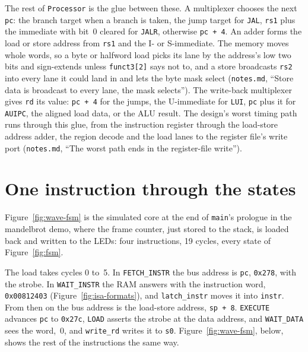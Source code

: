 \documentclass[11pt,a4paper]{report}
\newcommand{\notes}[1]{(\texttt{notes.md}, ``#1'')}
\begin{document}
The rest of \texttt{Processor} is the glue between these. A multiplexer chooses the next
\texttt{pc}: the branch target when a branch is taken, the jump target for \texttt{JAL},
\texttt{rs1} plus the immediate with bit~0 cleared for \texttt{JALR}, otherwise
\texttt{pc + 4}. An adder forms the load or store address from \texttt{rs1} and the I- or
S-immediate. The memory moves whole words, so a byte or halfword load picks its lane by the
address's low two bits and sign-extends unless \texttt{funct3[2]} says not to, and a store
broadcasts \texttt{rs2} into every lane it could land in and lets the byte mask select
\notes{Store data is broadcast to every lane, the mask selects}. The write-back multiplexer
gives \texttt{rd} its value: \texttt{pc + 4} for the jumps, the U-immediate for
\texttt{LUI}, \texttt{pc} plus it for \texttt{AUIPC}, the aligned load data, or the ALU
result. The design's worst timing path runs through this glue, from the instruction register
through the load-store address adder, the region decode and the load lanes to the register
file's write port \notes{The worst path ends in the register-file write}.

\section{One instruction through the states}

Figure~\ref{fig:wave-fsm} is the simulated core at the end of \texttt{main}'s prologue in
the mandelbrot demo, where the frame counter, just stored to the stack, is loaded back and
written to the LEDs: four instructions, 19 cycles, every state of Figure~\ref{fig:fsm}.

The load takes cycles 0 to~5. In \texttt{FETCH\_INSTR} the bus address is \texttt{pc},
\texttt{0x278}, with the strobe. In \texttt{WAIT\_INSTR} the RAM answers with the
instruction word, \texttt{0x00812403} (Figure~\ref{fig:isa-formats}), and \texttt{latch\_instr} moves it into
\texttt{instr}. From then on the bus address is the load-store address, \texttt{sp + 8}.
\texttt{EXECUTE} advances \texttt{pc} to \texttt{0x27c}, \texttt{LOAD} asserts the strobe at
the data address, and \texttt{WAIT\_DATA} sees the word,~0, and \texttt{write\_rd} writes it to
\texttt{s0}. Figure~\ref{fig:wave-fsm}, below, shows the rest of the instructions the same way.
\end{document}
